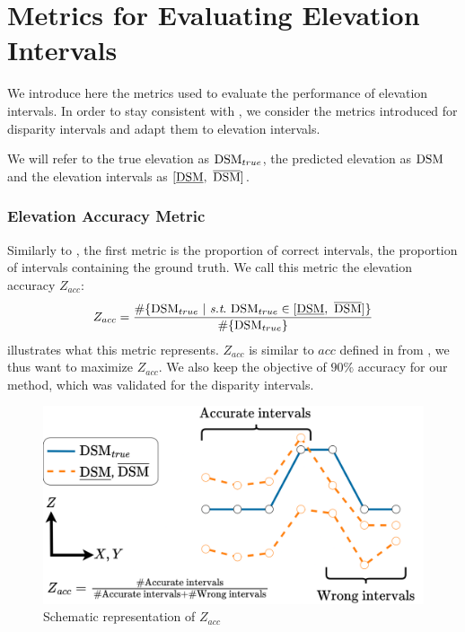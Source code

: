 \section{Metrics for Evaluating Elevation Intervals}\label{sec:metrics_elevation}
We introduce here the metrics used to evaluate the performance of elevation intervals. In order to stay consistent with , we consider the metrics introduced for disparity intervals and adapt them to elevation intervals. 

We will refer to the true elevation as $\mathrm{DSM}_{true}$, the predicted elevation as $\mathrm{DSM}$ and the elevation intervals as $[\underline{\mathrm{DSM}},~\overline{\mathrm{DSM}}]$.

\subsubsection{Elevation Accuracy Metric}
Similarly to , the first metric is the proportion of correct intervals, \ie the proportion of intervals containing the ground truth. We call this metric the elevation accuracy $Z_{acc}$:
\begin{align}\label{eq:relative_accuracy_elevation}
    Z_{acc} = \dfrac{\#\{\DSM_{true} ~|~ \st ~\DSM_{true}\in [\underline{\DSM},~\overline{\DSM}]\}}{\#\{\DSM_{true}\}}
\end{align}
 illustrates what this metric represents. $Z_{acc}$ is similar to $acc$ defined in  from , we thus want to maximize $Z_{acc}$. We also keep the objective of $90\%$ accuracy for our method, which was validated for the disparity intervals.

\begin{figure}
    \centering
    \includegraphics[width=0.7\linewidth]{Images/Chap_6/Intervals_elevation_metrics_Z_acc.png}
    \caption{Schematic representation of $Z_{acc}$}
    \label{fig:Intervals_elevation_metrics_Z_acc}
\end{figure}

